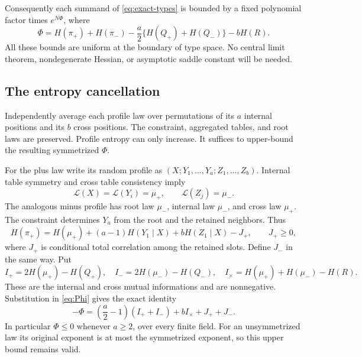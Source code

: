 Consequently each summand of \eqref{eq:exact-types} is bounded by a
fixed polynomial factor times $e^{N\Phi}$, where
\begin{equation}\label{eq:Phi}
 \Phi=H(\pi_+)+H(\pi_-)
       -\frac a2\{H(Q_+)+H(Q_-)\}-bH(R).
\end{equation}
All these bounds are uniform at the boundary of type space. No central
limit theorem, nondegenerate Hessian, or asymptotic saddle constant
will be needed.

\subsection{The entropy cancellation}
Independently average each profile law over permutations of its $a$
internal positions and its $b$ cross positions. The constraint,
aggregated tables, and root laws are preserved. Profile entropy can
only increase. It suffices to upper-bound the resulting symmetrized
$\Phi$.

For the plus law write its random profile as
$(X;Y_1,\ldots,Y_a;Z_1,\ldots,Z_b)$. Internal table symmetry and cross
table consistency imply
\[
 \mathcal L(X)=\mathcal L(Y_i)=\mu_+,
 \qquad \mathcal L(Z_j)=\mu_-.
\]
The analogous minus profile has root law $\mu_-$, internal law
$\mu_-$, and cross law $\mu_+$. The constraint determines $Y_a$ from
the root and the retained neighbors. Thus
\begin{equation}\label{eq:subadd}
 H(\pi_+)=H(\mu_+)+(a-1)H(Y_1\mid X)+bH(Z_1\mid X)-J_+,
 \qquad J_+\ge0,
\end{equation}
where $J_+$ is conditional total correlation among the retained slots.
Define $J_-$ in the same way. Put
\[
 I_+=2H(\mu_+)-H(Q_+),\quad
 I_-=2H(\mu_-)-H(Q_-),\quad
 I_\times=H(\mu_+)+H(\mu_-)-H(R).
\]
These are the internal and cross mutual informations and are nonnegative.
Substitution in \eqref{eq:Phi} gives the exact identity
\begin{equation}\label{eq:entropy-identity}
 -\Phi=\left(\frac a2-1\right)(I_++I_-)
          +bI_\times+J_++J_-.
\end{equation}
In particular $\Phi\le0$ whenever $a\ge2$, over every finite field.
For an unsymmetrized law its original exponent is at most the
symmetrized exponent, so this upper bound remains valid.

